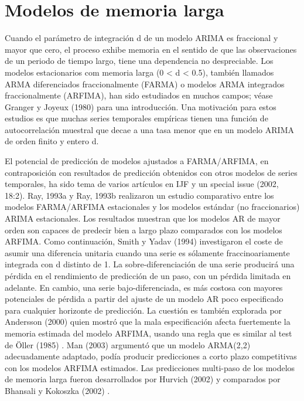 \documentclass{llncs}
\begin{document}
\section{Modelos de memoria larga}
Cuando el parámetro de integración d de un modelo ARIMA es fraccional y mayor que cero, el proceso exhibe memoria en el sentido de que las observaciones de un periodo de tiempo largo, tiene una dependencia no despreciable. Los modelos estacionarios com memoria larga (0 < d < 0.5), también llamados ARMA diferenciados fraccionalmente (FARMA) o modelos ARMA integrados fraccionalmente (ARFIMA), han sido estudiados en muchos campos; véase Granger y Joyeux (1980) \cite{Granger198015} para una introducción. Una motivación para estos estudios es que muchas series temporales empíricas tienen una función de autocorrelación muestral que decae a una tasa menor que en un modelo ARIMA de orden finito y entero d.

El potencial de predicción de modelos ajustados a FARMA/ARFIMA, en contraposición con resultados de predicción obtenidos con otros modelos de series temporales, ha sido tema de varios artículos en IJF y un special issue (2002, 18:2). Ray, 1993a \cite{Ray1993255} y Ray, 1993b \cite{Ray1993511} realizaron un estudio comparativo entre los modelos FARMA/ARFIMA estacionales y los modelos estándar (no fraccionarios) ARIMA estacionales. Los resultados muestran que los modelos AR de mayor orden son capaces de predecir bien a largo plazo comparados con los modelos ARFIMA. Como continuación, Smith y Yadav (1994) \cite{Smith1994507} investigaron el coste de asumir una diferencia unitaria cuando una serie es sólamente fraccinoariamente integrada con d distinto de 1. La sobre-diferenciación de una serie producirá una pérdida en el rendimiento de predicción de un paso, con un pérdida limitada en adelante. En cambio, una serie bajo-diferenciada, es más costosa con mayores potenciales de pérdida a partir del ajuste de un modelo AR poco especificado para cualquier horizonte de predicción. La cuestión es también explorada por Andersson (2000) \cite{Andersson2000121} quien mostró que la mala especificación afecta fuertemente la memoria estimada del modelo ARFIMA, usando una regla que es similar al test de Öller (1985) \cite{Öller1985135}. Man (2003) \cite{Man2003477} argumentó que un modelo ARMA(2,2) adecuadamente adaptado, podía producir predicciones a corto plazo competitivas con los modelos ARFIMA estimados. Las predicciones multi-paso de los modelos de memoria larga fueron desarrollados por Hurvich (2002) \cite{Hurvich2002167} y comparados por Bhansali y Kokoszka (2002) \cite{Bhansali2002181}.
\end{document}
